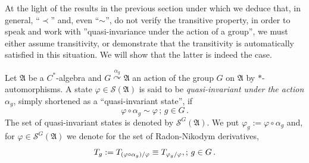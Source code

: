 \documentclass[12pt]{amsart}
\numberwithin{equation}{section}
\def\cs{{\mathcal S}}
\def\ga{{\mathfrak A}} \def\gpa{{\mathfrak a}}
\def\a{\alpha}
\def\f{\varphi}\def\ff{\phi} \def\F{\Phi}
\begin{document}
At the light of the results in the previous section under which we deduce that, in general, ``$\prec$'' and, even ``$\sim$'', do not verify the transitive property, in order to speak and work with ''quasi-invariance under the action of a group'', we must either assume transitivity, or demonstrate that the transitivity is automatically satisfied in this situation. We will show that the latter is indeed the case.

\medskip

Let $\ga$ be a $C^*$-algebra and $G\stackrel{\a_g}{\curvearrowright}\ga$ an action of the group $G$ on $\ga$ by $*$-automorphisms. A state $\f\in\cs(\ga)$ is said to be {\it quasi-invariant under the action} $\a_g$, simply shortened as a ``quasi-invariant state'', if
$$
\f\circ\a_g\sim\f\,;\, g\in G\,.
$$
The set of quasi-invariant states is denoted by $\cs^G(\ga)$. We put $\f_g:=\f\circ\a_g$ and, for $\f\in\cs^G(\ga)$ we denote for the set of Radon-Nikodym derivatives, 
$$
T_g:=T_{(\f\circ\a_g)/\f}\equiv T_{\f_g/\f}\\,;\, g\in G\,.
$$
\end{document}

